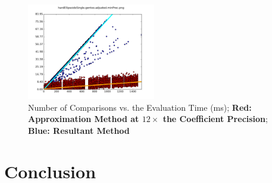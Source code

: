 \documentclass{cccg16}
\begin{document}
\begin{figure}
  \includegraphics[width=0.5\textwidth]{imgs/hardEllipsoidsSingle_gentoo_adjusted.png}
  \caption{Number of Comparisons vs. the Evaluation Time (ms); {\bf Red:
      Approximation Method at $12\times$ the Coefficient Precision};
    {\bf Blue: Resultant Method}}
\end{figure}

\section{Conclusion}



\end{document}

